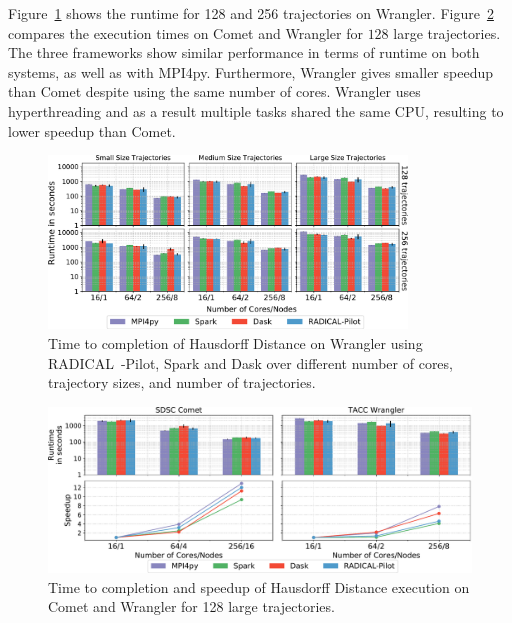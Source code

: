 Figure~\ref{fig:HausdorffWrangler} shows the runtime for 128 and 256 trajectories on Wrangler.
Figure~\ref{fig:comet_wrangler_haus} compares the execution times on Comet and Wrangler for $128$ large trajectories.
The three frameworks show similar performance in terms of runtime on both systems, as well as with MPI4py.
Furthermore, Wrangler gives smaller speedup than Comet despite using the same number of cores.
Wrangler uses hyperthreading and as a result multiple tasks shared the same CPU, resulting to lower speedup than Comet.

\begin{figure}[t]
    \centering
    \includegraphics[width=0.85\textwidth]{figures/data_analytics_hpc/task_par/HausdorffSingleFig.pdf}
    \caption{Time to completion of Hausdorff Distance on Wrangler using RADICAL~-Pilot, Spark and Dask over different number of cores, trajectory sizes, and number of trajectories.}
            \label{fig:HausdorffWrangler}
\end{figure}

\begin{figure}[t]
    \centering
    \includegraphics[width=.85\textwidth]{figures/data_analytics_hpc/task_par/comet_wrangler_haus.pdf}
    \caption{Time to completion and speedup of Hausdorff Distance execution on Comet and Wrangler for 128 large trajectories.} 
    \label{fig:comet_wrangler_haus}
\end{figure}

